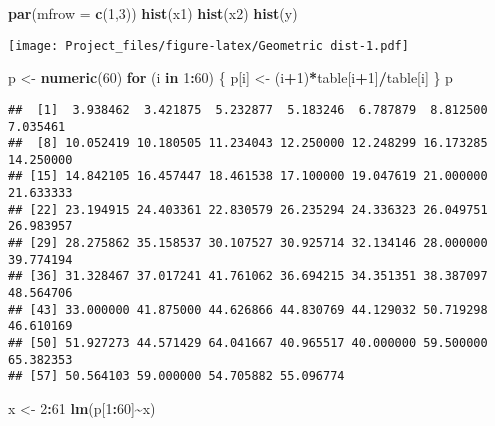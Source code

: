 \documentclass[
]{article}
\newenvironment{Shaded}{\begin{snugshade}}{\end{snugshade}}
\newcommand{\AttributeTok}[1]{\textcolor[rgb]{0.13,0.29,0.53}{#1}}
\newcommand{\ControlFlowTok}[1]{\textcolor[rgb]{0.13,0.29,0.53}{\textbf{#1}}}
\newcommand{\DecValTok}[1]{\textcolor[rgb]{0.00,0.00,0.81}{#1}}
\newcommand{\FunctionTok}[1]{\textcolor[rgb]{0.13,0.29,0.53}{\textbf{#1}}}
\newcommand{\NormalTok}[1]{#1}
\newcommand{\OtherTok}[1]{\textcolor[rgb]{0.56,0.35,0.01}{#1}}
\newcommand{\SpecialCharTok}[1]{\textcolor[rgb]{0.81,0.36,0.00}{\textbf{#1}}}
\begin{document}
\begin{Shaded}
\begin{Highlighting}[]
\FunctionTok{par}\NormalTok{(}\AttributeTok{mfrow =} \FunctionTok{c}\NormalTok{(}\DecValTok{1}\NormalTok{,}\DecValTok{3}\NormalTok{))}
\FunctionTok{hist}\NormalTok{(x1)}
\FunctionTok{hist}\NormalTok{(x2)}
\FunctionTok{hist}\NormalTok{(y)}
\end{Highlighting}
\end{Shaded}

\texttt{[image: Project\_files/figure-latex/Geometric dist-1.pdf]}

\begin{Shaded}
\begin{Highlighting}[]
\NormalTok{p }\OtherTok{\textless{}{-}} \FunctionTok{numeric}\NormalTok{(}\DecValTok{60}\NormalTok{)}
\ControlFlowTok{for}\NormalTok{ (i }\ControlFlowTok{in} \DecValTok{1}\SpecialCharTok{:}\DecValTok{60}\NormalTok{) \{}
\NormalTok{  p[i] }\OtherTok{\textless{}{-}}\NormalTok{ (i}\SpecialCharTok{+}\DecValTok{1}\NormalTok{)}\SpecialCharTok{*}\NormalTok{table[i}\SpecialCharTok{+}\DecValTok{1}\NormalTok{]}\SpecialCharTok{/}\NormalTok{table[i]}
\NormalTok{\}}
\NormalTok{p}
\end{Highlighting}
\end{Shaded}

\begin{verbatim}
##  [1]  3.938462  3.421875  5.232877  5.183246  6.787879  8.812500  7.035461
##  [8] 10.052419 10.180505 11.234043 12.250000 12.248299 16.173285 14.250000
## [15] 14.842105 16.457447 18.461538 17.100000 19.047619 21.000000 21.633333
## [22] 23.194915 24.403361 22.830579 26.235294 24.336323 26.049751 26.983957
## [29] 28.275862 35.158537 30.107527 30.925714 32.134146 28.000000 39.774194
## [36] 31.328467 37.017241 41.761062 36.694215 34.351351 38.387097 48.564706
## [43] 33.000000 41.875000 44.626866 44.830769 44.129032 50.719298 46.610169
## [50] 51.927273 44.571429 64.041667 40.965517 40.000000 59.500000 65.382353
## [57] 50.564103 59.000000 54.705882 55.096774
\end{verbatim}

\begin{Shaded}
\begin{Highlighting}[]
\NormalTok{x }\OtherTok{\textless{}{-}} \DecValTok{2}\SpecialCharTok{:}\DecValTok{61}
\FunctionTok{lm}\NormalTok{(p[}\DecValTok{1}\SpecialCharTok{:}\DecValTok{60}\NormalTok{]}\SpecialCharTok{\textasciitilde{}}\NormalTok{x)}
\end{Highlighting}
\end{Shaded}
\end{document}
